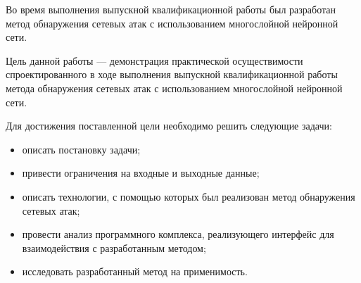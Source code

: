 \maketableofcontents

\intro




Во время выполнения выпускной квалификационной работы был разработан метод обнаружения сетевых атак с использованием многослойной нейронной сети.


Цель данной работы --- демонстрация практической осуществимости спроектированного в
ходе выполнения выпускной квалификационной работы метода обнаружения сетевых атак с использованием многослойной нейронной сети.

Для достижения поставленной цели необходимо решить следующие задачи:

\begin{itemize}
    \item описать постановку задачи;
    \item привести ограничения на входные и выходные данные;
    \item описать технологии, с помощью которых был реализован метод обнаружения сетевых атак;
	\item провести анализ программного комплекса, реализующего интерфейс для взаимодействия с разработанным методом;
	\item исследовать разработанный метод на применимость.
\end{itemize}

